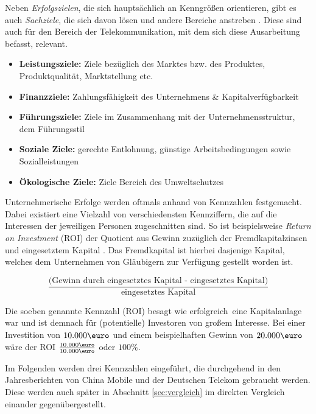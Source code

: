 Neben \textit{Erfolgszielen}, die sich hauptsächlich an Kenngrößen orientieren, gibt es auch \textit{Sachziele}, die sich davon lösen und andere Bereiche anstreben \cite{domschke}. Diese sind auch für den Bereich der Telekommunikation, mit dem sich diese Ausarbeitung befasst, relevant.

\label{unternehmensziele}
\begin{itemize}
\item \textbf{Leistungsziele:} Ziele bezüglich des Marktes bzw. des Produktes, Produktqualität, Marktstellung etc.
\item \textbf{Finanzziele:} Zahlungsfähigkeit des Unternehmens \& Kapitalverfügbarkeit
\item \textbf{Führungsziele:} Ziele im Zusammenhang mit der Unternehmensstruktur, dem Führungsstil 
\item \textbf{Soziale Ziele:} gerechte Entlohnung, günstige Arbeitsbedingungen sowie Sozialleistungen
\item \textbf{Ökologische Ziele:} Ziele Bereich des Umweltschutzes
\end{itemize}

Unternehmerische Erfolge werden oftmals anhand von Kennzahlen festgemacht. Dabei existiert eine Vielzahl von verschiedensten Kennziffern, die auf die Interessen der jeweiligen Personen zugeschnitten sind. So ist beispielsweise \textit{Return on Investment} (ROI) der Quotient aus Gewinn zuzüglich der Fremdkapitalzinsen und eingesetztem Kapital \cite{domschke}. Das Fremdkapital ist hierbei dasjenige Kapital, welches dem Unternehmen von Gläubigern zur Verfügung gestellt worden ist.

\begin{equation}
\frac{\text{(Gewinn durch eingesetztes Kapital - eingesetztes Kapital)}}{\text{eingesetztes Kapital}}
\end{equation}

Die soeben genannte Kennzahl (ROI) besagt wie \glqq erfolgreich\grqq \ eine Kapitalanlage war und ist demnach für (potentielle) Investoren von großem Interesse. Bei einer Investition von $10.000\text{\euro}$ und einem beispielhaften Gewinn von $20.000\text{\euro}$ wäre der ROI $\frac{10.000\text{\euro}}{10.000\text{\euro}}$ oder $100\%$. 

Im Folgenden werden drei Kennzahlen eingeführt, die durchgehend in den Jahresberichten von China Mobile und der Deutschen Telekom gebraucht werden. Diese werden auch später in Abschnitt \ref{sec:vergleich} im direkten Vergleich einander gegenübergestellt.

